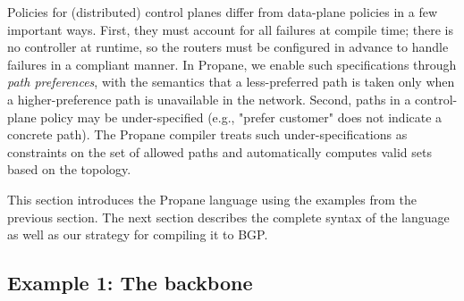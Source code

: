 \documentclass[10pt]{sigalternate052015}
\newcommand{\sysname}{{\small \sf Propane}\xspace}
\begin{document}
Policies for (distributed) control planes differ from data-plane
policies in a few important ways. First, they must account for all failures at compile time; there is
no controller at runtime, so the routers must be configured in advance to handle failures in a compliant manner.
%
In \sysname, we enable such specifications through {\em path preferences}, with the semantics that a less-preferred path is taken only when a higher-preference path is unavailable in the network.
%
Second, paths in a control-plane policy may be under-specified (e.g.,
"prefer customer" does not indicate a concrete path). The \sysname
compiler treats such under-specifications as constraints on the set of
allowed paths and automatically computes valid sets based on the topology.
%

This section introduces the \sysname language using the
examples from the previous section.
The next section describes the complete syntax of the
language as well as our strategy for compiling it to
BGP.

\subsection{Example 1: The backbone}

\end{document}
